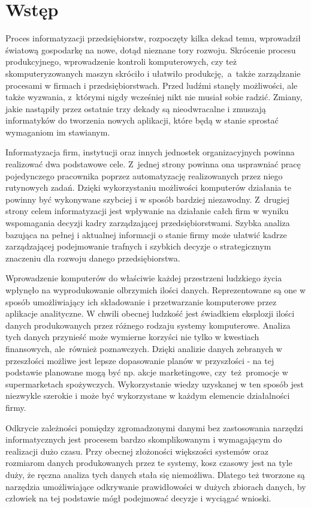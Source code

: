 \chapter{Wstęp}
Proces informatyzacji przedsiębiorstw, rozpoczęty kilka dekad temu, wprowadził światową gospodarkę na nowe, dotąd nieznane tory rozwoju. Skrócenie procesu produkcyjnego, wprowadzenie kontroli komputerowych, czy też skomputeryzowanych maszyn skróciło i ułatwiło produkcję,~a~także zarządzanie procesami w firmach i przedsiębiorstwach. Przed ludźmi stanęły możliwości, ale także wyzwania, z~którymi nigdy wcześniej nikt nie musiał sobie radzić. Zmiany, jakie nastąpiły przez ostatnie trzy dekady są nieodwracalne i zmuszają informatyków do tworzenia nowych aplikacji, które będą w stanie sprostać wymaganiom im stawianym.

Informatyzacja firm, instytucji oraz innych jednostek organizacyjnych powinna realizować dwa podstawowe cele. Z~jednej strony powinna ona usprawniać pracę pojedynczego pracownika poprzez automatyzację realizowanych przez niego rutynowych zadań. Dzięki wykorzystaniu możliwości komputerów działania te powinny być wykonywane szybciej i w sposób bardziej niezawodny. Z~drugiej strony celem informatyzacji jest wpływanie na działanie całch firm w wyniku wspomagania decyzji kadry zarządzającej przedsiębiorstwami. Szybka analiza bazująca na pełnej i aktualnej informacji o stanie firmy może ułatwić kadrze zarządzającej podejmowanie trafnych i szybkich decyzje o strategicznym znaczeniu dla rozwoju danego przedsiębiorstwa.

Wprowadzenie komputerów do właściwie każdej przestrzeni ludzkiego życia wpłynęło na wyprodukowanie olbrzymich ilości danych. Reprezentowane są one w sposób umożliwiający ich składowanie i przetwarzanie komputerowe przez aplikacje analityczne. W chwili obecnej ludzkość jest świadkiem eksplozji ilości danych produkowanych przez różnego rodzaju systemy komputerowe. Analiza tych danych przynieść może wymierne korzyści nie tylko w kwestiach finansowych, ale~również poznawczych. Dzięki analizie danych zebranych w przeszłości możliwe jest lepsze dopasowanie planów w przyszłości - na tej podstawie planowane mogą być np. akcje marketingowe, czy~też~promocje w supermarketach spożywczych. Wykorzystanie wiedzy uzyskanej w ten sposób jest niezwykle szerokie i może być wykorzystane w każdym elemencie działalności firmy.

Odkrycie zależności pomiędzy zgromadzonymi danymi bez zastosowania narzędzi informatycznych jest procesem bardzo skomplikowanym i wymagającym do realizacji dużo czasu. Przy obecnej złożoności większości systemów oraz rozmiarom danych produkowanych przez te systemy, kosz czasowy jest na tyle duży, że ręczna analiza tych danych stała się niemożliwa. Dlatego też tworzone są narzędzia umożliwiające odkrywanie prawidłowości w dużych zbiorach danych, by człowiek na tej podstawie mógł podejmować decyzje i wyciągać wnioski.

